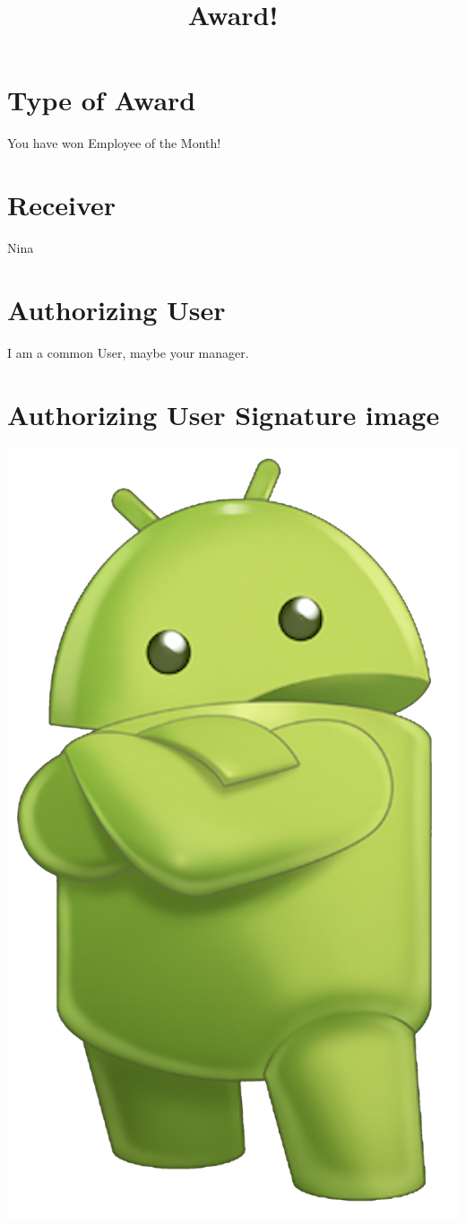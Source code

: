 \documentclass[20pt,a4papper]{article}
\begin{document}
\title{Award!}
\maketitle


\section{Type of Award}
You have won Employee of the Month!

\section{Receiver}
Nina

\section{Authorizing User}
I am a common User, maybe your manager.

\section{Authorizing User Signature image}
\begin{center}
\includegraphics[scale=0.06]{signature.png}
\end{center}
\end{document}
